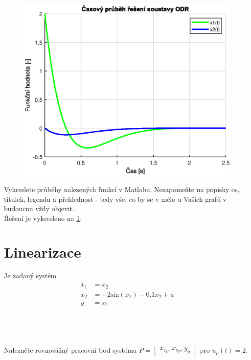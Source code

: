 \documentclass[twoside]{article}
\begin{document}
\subsection{~}
\begin{figure}[htb]
	\includegraphics{solution22.eps}
	\label{fig:reseni22}
\end{figure}
Vykreslete průběhy nalezených funkcí v Matlabu. Nezapomeňte na popisky os, titulek, legendu a přehlednost - tedy vše,
co by se v mělo u Vašich grafů v budoucnu vždy objevit. \\
Řešení je vykresleno na \ref{fig:reseni22}.

\section{Linearizace}
\label{sec:ukol3}
Je zadaný systém
\begin{equation}
	\begin{split}
		\dot{x_1} &= x_2 \\
		\dot{x_2} &= -2 \text{sin}(x_1) - 0.1x_2 +u \\
		y &= x_1
	\end{split}
\end{equation}

\subsection{~}
Nalezněte rovnovážný pracovní bod systému $P = \begin{bmatrix} x_{1p}, x_{2p}, y_p \end{bmatrix}$ pro $u_p (t) = 2$.
\end{document}
